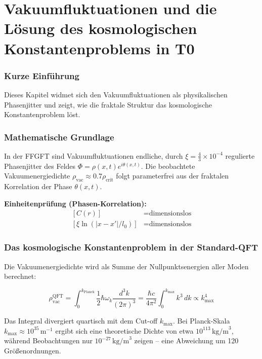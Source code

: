 \chapter{Vakuumfluktuationen und die Lösung des kosmologischen Konstantenproblems in T0}


	
	\subsection*{Kurze Einführung}
	
	Dieses Kapitel widmet sich den Vakuumfluktuationen als physikalischen Phasenjitter und zeigt, wie die fraktale Struktur das kosmologische Konstantenproblem löst.
	
	\subsection*{Mathematische Grundlage}
	
	In der FFGFT sind Vakuumfluktuationen endliche, durch \(\xi = \frac{4}{3} \times 10^{-4}\) regulierte Phasenjitter des Feldes \(\Phi = \rho(x,t) e^{i\theta(x,t)}\). Die beobachtete Vakuumenergiedichte \(\rho_{\text{vac}} \approx 0.7 \rho_{\text{crit}}\) folgt parameterfrei aus der fraktalen Korrelation der Phase \(\theta(x,t)\).
	
	
	
	\textbf{Einheitenprüfung (Phasen-Korrelation):}
	\[
	\begin{aligned}
		[C(r)] &= \text{dimensionslos} \\
		[\xi \ln(|x-x'|/l_0)] &= \text{dimensionslos}
	\end{aligned}
	\]
	
	\subsection*{Das kosmologische Konstantenproblem in der Standard-QFT}
	
	Die Vakuumenergiedichte wird als Summe der Nullpunktsenergien aller Moden berechnet:
	
	\begin{equation}
		\rho_{\text{vac}}^{\text{QFT}} = \int_0^{k_{\text{Planck}}} \frac{1}{2} \hbar \omega_k \frac{d^3k}{(2\pi)^3} = \frac{\hbar c}{4\pi^2} \int_0^{k_{\max}} k^3 \, dk \propto k_{\max}^4
	\end{equation}
	
	Das Integral divergiert quartisch mit dem Cut-off \(k_{\max}\). Bei Planck-Skala \(k_{\max} \approx 10^{35} \, \text{m}^{-1}\) ergibt sich eine theoretische Dichte von etwa \(10^{113} \, \text{kg/m}^3\), während Beobachtungen nur \(10^{-27} \, \text{kg/m}^3\) zeigen – eine Abweichung um 120 Größenordnungen.
	
